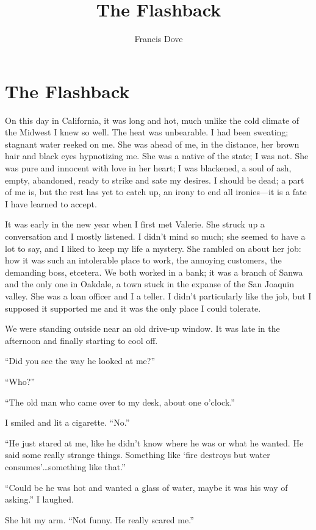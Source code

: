 \documentclass[
]{article}
\title{The Flashback}
\author{Francis Dove}
\date{}
\begin{document}
\maketitle

\section{The Flashback}\label{the-flashback}

On this day in California, it was long and hot, much unlike the cold
climate of the Midwest I knew so well. The heat was unbearable. I had
been sweating; stagnant water reeked on me. She was ahead of me, in the
distance, her brown hair and black eyes hypnotizing me. She was a native
of the state; I was not. She was pure and innocent with love in her
heart; I was blackened, a soul of ash, empty, abandoned, ready to strike
and sate my desires. I should be dead; a part of me is, but the rest has
yet to catch up, an irony to end all ironies---it is a fate I have
learned to accept.

It was early in the new year when I first met Valerie. She struck up a
conversation and I mostly listened. I didn't mind so much; she seemed to
have a lot to say, and I liked to keep my life a mystery. She rambled on
about her job: how it was such an intolerable place to work, the
annoying customers, the demanding boss, etcetera. We both worked in a
bank; it was a branch of Sanwa and the only one in Oakdale, a town stuck
in the expanse of the San Joaquin valley. She was a loan officer and I a
teller. I didn't particularly like the job, but I supposed it supported
me and it was the only place I could tolerate.

We were standing outside near an old drive-up window. It was late in the
afternoon and finally starting to cool off.

``Did you see the way he looked at me?''

``Who?''

``The old man who came over to my desk, about one o'clock.''

I smiled and lit a cigarette. ``No.''

``He just stared at me, like he didn't know where he was or what he
wanted. He said some really strange things. Something like `fire
destroys but water consumes'\ldots something like that.''

``Could be he was hot and wanted a glass of water, maybe it was his way
of asking.'' I laughed.

She hit my arm. ``Not funny. He really scared me.''
\end{document}

